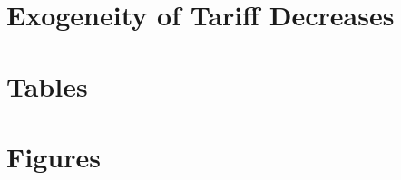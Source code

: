 \documentclass[12pt]{article}
\begin{document}


\vspace{-10pt}
\section{Exogeneity of Tariff Decreases}
\label{sec:Exogeneity}

\newpage
\singlespacing



\appendix
\singlespacing

\section{Tables}
\label{sec:Tables}
\fontsize{10pt}{12pt}\selectfont


\section{Figures}
\label{sec:Figures}


\end{document}
